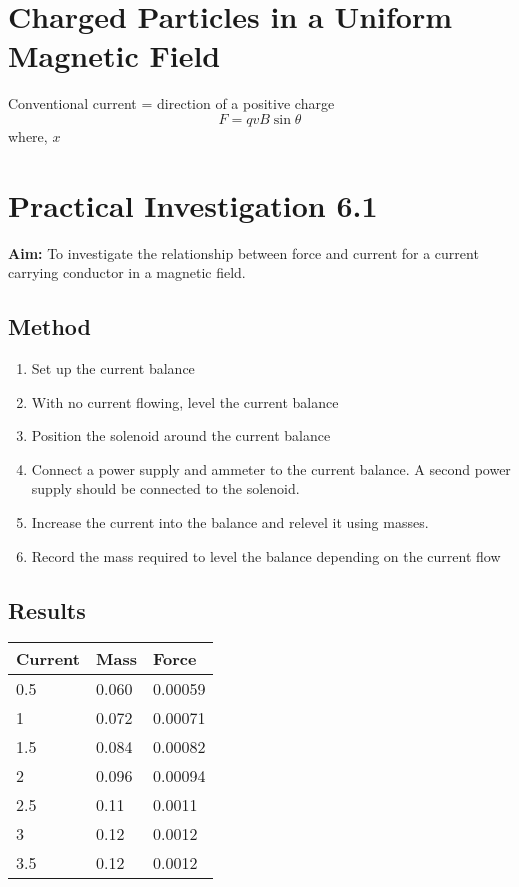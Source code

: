 \section{Charged Particles in a Uniform Magnetic Field} \label{18/02/2025}
	Conventional current = direction of a positive charge
	$$F = qvB \sin{\theta}$$
	where, $x$

\section{Practical Investigation 6.1} \label{20/02/2025}
	\textbf{Aim:} To investigate the relationship between force and current for a current carrying conductor in a magnetic field.

	\subsection{Method}
		\begin{enumerate}
			\item Set up the current balance
			\item With no current flowing, level the current balance
			\item Position the solenoid around the current balance
			\item Connect a power supply and ammeter to the current balance. A second power supply should be connected to the solenoid.
			\item Increase the current into the balance and relevel it using masses.
			\item Record the mass required to level the balance depending on the current flow
		\end{enumerate}
	
	\subsection{Results}
		\begin{table}[htbp]
			\centering
			\begin{tabular}{l|l|l}
				Current	& Mass	& Force \\ \hline
				0.5 	& 0.060	& 0.00059	\\
				1	& 0.072	& 0.00071	\\
				1.5	& 0.084	& 0.00082	\\
				2	& 0.096	& 0.00094	\\
				2.5	& 0.11	& 0.0011	\\
				3	& 0.12	& 0.0012	\\
				3.5	& 0.12	& 0.0012
			\end{tabular}
		\end{table}

